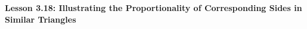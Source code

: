 \begin{center}
\textbf{Lesson 3.18: Illustrating the Proportionality of Corresponding Sides in Similar Triangles}
\end{center}

\vspace*{-1.5ex}


